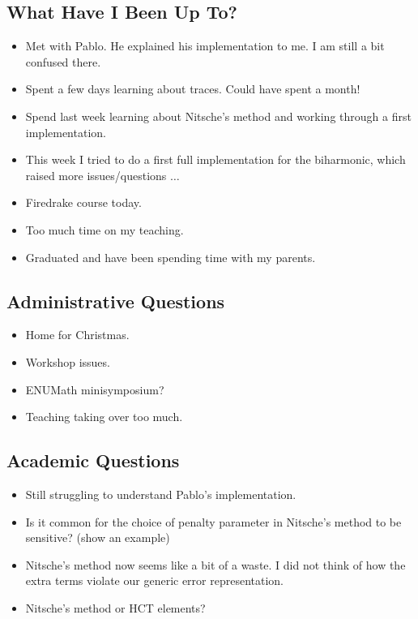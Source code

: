 \documentclass[12pt,a4paper]{article}
\begin{document}
\subsection{What Have I Been Up To?}

\begin{itemize}
    \item Met with Pablo. He explained his implementation to me. I am still a bit confused there.
    \item Spent a few days learning about traces. Could have spent a month!
    \item Spend last week learning about Nitsche's method and working through a first implementation.
    \item This week I tried to do a first full implementation for the biharmonic, which raised more issues/questions $\dots$
    \item Firedrake course today.
    \item Too much time on my teaching.
    \item Graduated and have been spending time with my parents. 
\end{itemize}

\subsection{Administrative Questions}

\begin{itemize}
    \item Home for Christmas. 
    \item Workshop issues.
    \item ENUMath minisymposium?
    \item Teaching taking over too much. 
\end{itemize}

\subsection{Academic Questions}

\begin{itemize}
    \item Still struggling to understand Pablo's implementation. 
    \item Is it common for the choice of penalty parameter in Nitsche's method to be sensitive? (show an example)
    \item Nitsche's method now seems like a bit of a waste. I did not think of how the extra terms violate our generic error representation. 
    \item Nitsche's method or HCT elements? 
\end{itemize}
\end{document}
